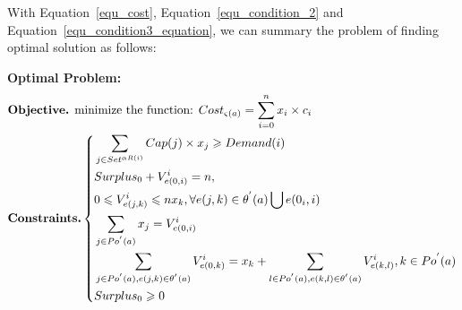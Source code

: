 With Equation~\ref{equ_cost}, Equation~\ref{equ_condition_2} and Equation~\ref{equ_condition3_equation},
we can summary the problem of finding optimal solution as follows:
\begin{problem}
\textbf{Optimal Problem:}
\label{pro_optimal}
\begin{equation}
\label{equ_final}
\begin{split}
&\text{\textbf{Objective.} minimize the function: }Cost_{\varsigma(a)} = \sum_{i=0}^{n}x_i \times c_i \\
&\text{\textbf{Constraints.}}\left\{
\begin{aligned}
& \sum_{j \in Set^{\alpha{R}(i)}} Cap(j) \times x_j \geqslant Demand(i) \\
& Surplus_0+V^{i}_{e(0,i)} = n,     \\
& 0 \leqslant V^{i}_{e(j,k)} \leqslant nx_k, \forall e(j,k) \in {\theta}^{'}(a)\bigcup e(0_i, i)  \\
& \sum_{j \in {Po}^{'}(a)}x_j = V^{i}_{e(0,i)}\\
& \sum_{j \in {Po}^{'}(a), e(j,k) \in {\theta}^{'}(a)} V^{i}_{e(0,k)} = x_k + \sum_{l \in {Po}^{'}(a), e(k,l) \in {\theta}^{'}(a) } V^{i}_{e(k, l)}, k \in Po^{'}(a) \\
& Surplus_0 \geqslant 0\\
\end{aligned}
\right.
\end{split}
\end{equation}
\end{problem}
